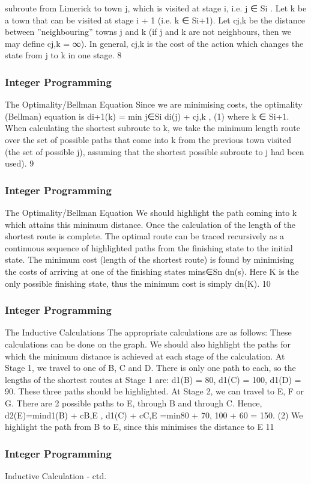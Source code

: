 \begin{frame}
subroute from Limerick to town j, which is visited at stage i, i.e.
j ∈ Si
.
Let k be a town that can be visited at stage i + 1 (i.e. k ∈ Si+1).
Let cj,k be the distance between ”neighbouring” towns j and k (if
j and k are not neighbours, then we may define cj,k = ∞).
In general, cj,k is the cost of the action which changes the state
from j to k in one stage.
8 \end{frame}  \begin{frame} \frametitle{Integer Programming}     
The Optimality/Bellman Equation
Since we are minimising costs, the optimality (Bellman) equation is
di+1(k) = min
j∈Si
{di(j) + cj,k }, (1)
where k ∈ Si+1.
When calculating the shortest subroute to k, we take the minimum
length route over the set of possible paths that come into k from
the previous town visited (the set of possible j), assuming that the
shortest possible subroute to j had been used).
9 \end{frame}  \begin{frame} \frametitle{Integer Programming}     
The Optimality/Bellman Equation
We should highlight the path coming into k which attains this
minimum distance. Once the calculation of the length of the
shortest route is complete. The optimal route can be traced
recursively as a continuous sequence of highlighted paths from the
finishing state to the initial state.
The minimum cost (length of the shortest route) is found by
minimising the costs of arriving at one of the finishing states
mins∈Sn dn(s). Here K is the only possible finishing state, thus the
minimum cost is simply dn(K).
10 \end{frame}  \begin{frame} \frametitle{Integer Programming}     
The Inductive Calculations
The appropriate calculations are as follows: These calculations can
be done on the graph. We should also highlight the paths for which
the minimum distance is achieved at each stage of the calculation.
At Stage 1, we travel to one of B, C and D. There is only one
path to each, so the lengths of the shortest routes at Stage 1 are:
d1(B) = 80, d1(C) = 100, d1(D) = 90. These three paths should
be highlighted.
At Stage 2, we can travel to E, F or G. There are 2 possible paths
to E, through B and through C. Hence,
d2(E)=min{d1(B) + cB,E , d1(C) + cC,E }
=min{80 + 70, 100 + 60} = 150. (2)
We highlight the path from B to E, since this minimises the
distance to E
11 \end{frame}  \begin{frame} \frametitle{Integer Programming}     
Inductive Calculation - ctd.

\end{frame}
